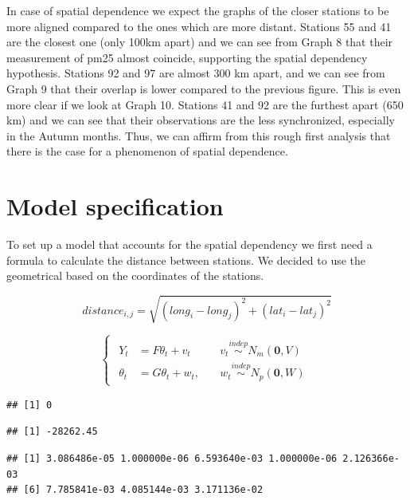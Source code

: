 \documentclass[
]{article}
\begin{document}
In case of spatial dependence we expect the graphs of the closer
stations to be more aligned compared to the ones which are more distant.
Stations 55 and 41 are the closest one (only 100km apart) and we can see
from Graph 8 that their measurement of pm25 almost coincide, supporting
the spatial dependency hypothesis. Stations 92 and 97 are almost 300 km
apart, and we can see from Graph 9 that their overlap is lower compared
to the previous figure. This is even more clear if we look at Graph 10.
Stations 41 and 92 are the furthest apart (650 km) and we can see that
their observations are the less synchronized, especially in the Autumn
months. Thus, we can affirm from this rough first analysis that there is
the case for a phenomenon of spatial dependence.

\hypertarget{model-specification}{%
\section{Model specification}\label{model-specification}}

To set up a model that accounts for the spatial dependency we first need
a formula to calculate the distance between stations. We decided to use
the geometrical based on the coordinates of the stations.

\[
distance_{i,j} = \sqrt{{(long_{i}-long_{j} )^2 + (lat_{i}-lat_{j})^2}}
\]

\[
\begin{cases}
\begin{aligned}
Y_t &= F \theta_t + v_t \quad & v_t  \overset{indep}\sim N_m(\textbf{0}, V) \\
\theta_t &= G \theta_t + w_t, \quad & w_t \overset{indep}\sim N_p(\textbf{0}, W) 
\end{aligned}
\end{cases}
\]

\begin{verbatim}
## [1] 0
\end{verbatim}

\begin{verbatim}
## [1] -28262.45
\end{verbatim}

\begin{verbatim}
## [1] 3.086486e-05 1.000000e-06 6.593640e-03 1.000000e-06 2.126366e-03
## [6] 7.785841e-03 4.085144e-03 3.171136e-02
\end{verbatim}
\end{document}
